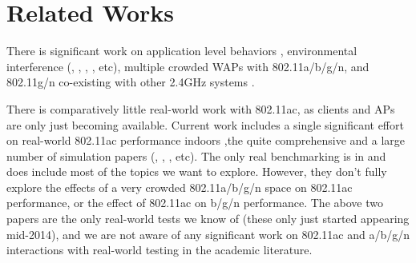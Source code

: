 \section{Related Works}
There is significant work on application level behaviors
\cite{verkaik2009softspeak}, environmental interference
(\cite{kamerman1997microwave}, \cite{golmie2003interference},
\cite{shin2007mutual}, \cite{gummadi2007understanding}, etc), multiple
crowded WAPs \cite{fuxjager2007myth} with 802.11a/b/g/n, and 802.11g/n
co-existing with other 2.4GHz systems \cite{petrova2007interference}.

There is comparatively little real-world work with 802.11ac, as
clients and APs are only just becoming available. Current work
includes a single significant effort on real-world 802.11ac
performance indoors \cite{dianu2014measurement},the quite
comprehensive \cite{zeng2014first} and a large number of simulation
papers (\cite{bellalta2012performance}, \cite{ong2011ieee},
\cite{redieteab2012mu} , etc). The only real benchmarking is in
\cite{zeng2014first} and does include most of the topics we want to
explore. However, they don't fully explore the effects of a very
crowded 802.11a/b/g/n space on 802.11ac performance, or the effect of
802.11ac on b/g/n performance. The above two papers are the only
real-world tests we know of (these only just started appearing
mid-2014), and we are not aware of any significant work on 802.11ac
and a/b/g/n interactions with real-world testing in the academic
literature.
